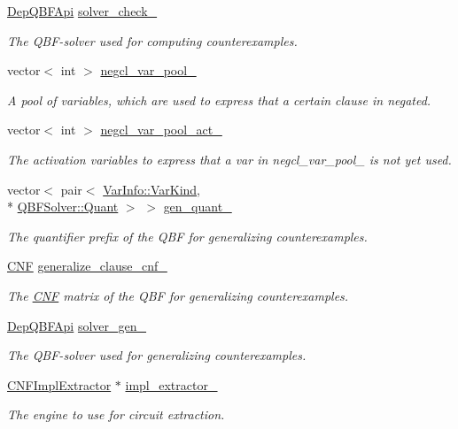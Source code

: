 \begin{DoxyCompactItemize}
\hyperlink{classDepQBFApi}{Dep\-Q\-B\-F\-Api} \hyperlink{classLearnSynthQBFInc_a687aa9738eafe0935a3f5c519f296fa9}{solver\-\_\-check\-\_\-}
\begin{DoxyCompactList}\small\item\em The Q\-B\-F-\/solver used for computing counterexamples. \end{DoxyCompactList}\item 
vector$<$ int $>$ \hyperlink{classLearnSynthQBFInc_a19491f53aaa9f3284ac58beae9136ee8}{negcl\-\_\-var\-\_\-pool\-\_\-}
\begin{DoxyCompactList}\small\item\em A pool of variables, which are used to express that a certain clause in negated. \end{DoxyCompactList}\item 
vector$<$ int $>$ \hyperlink{classLearnSynthQBFInc_aa9bc6dda9263e98fd3e5bfcfa9c062f9}{negcl\-\_\-var\-\_\-pool\-\_\-act\-\_\-}
\begin{DoxyCompactList}\small\item\em The activation variables to express that a var in negcl\-\_\-var\-\_\-pool\-\_\- is not yet used. \end{DoxyCompactList}\item 
vector$<$ pair$<$ \hyperlink{classVarInfo_a64d1da76cf84fe674e5fef9764ef11cf}{Var\-Info\-::\-Var\-Kind}, \\*
\hyperlink{classQBFSolver_ac091e263cb55286cc07b2451bcf4d3c7}{Q\-B\-F\-Solver\-::\-Quant} $>$ $>$ \hyperlink{classLearnSynthQBFInc_af42c16902cfccdf51d1c1bc112be0ee4}{gen\-\_\-quant\-\_\-}
\begin{DoxyCompactList}\small\item\em The quantifier prefix of the Q\-B\-F for generalizing counterexamples. \end{DoxyCompactList}\item 
\hyperlink{classCNF}{C\-N\-F} \hyperlink{classLearnSynthQBFInc_ad3d20b7d5e6b561c7cf46324962247ba}{generalize\-\_\-clause\-\_\-cnf\-\_\-}
\begin{DoxyCompactList}\small\item\em The \hyperlink{classCNF}{C\-N\-F} matrix of the Q\-B\-F for generalizing counterexamples. \end{DoxyCompactList}\item 
\hyperlink{classDepQBFApi}{Dep\-Q\-B\-F\-Api} \hyperlink{classLearnSynthQBFInc_ab5efae34f9ecd320b38f515c5ae6111d}{solver\-\_\-gen\-\_\-}
\begin{DoxyCompactList}\small\item\em The Q\-B\-F-\/solver used for generalizing counterexamples. \end{DoxyCompactList}\item 
\hyperlink{classCNFImplExtractor}{C\-N\-F\-Impl\-Extractor} $\ast$ \hyperlink{classLearnSynthQBFInc_a7f9f7f6eb87fa49356e728f165e92de7}{impl\-\_\-extractor\-\_\-}
\begin{DoxyCompactList}\small\item\em The engine to use for circuit extraction. \end{DoxyCompactList}\end{DoxyCompactItemize}
